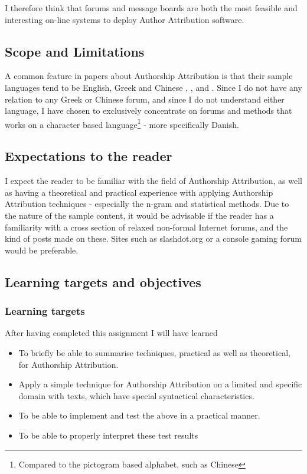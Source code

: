 I therefore think that forums and message boards are both the most feasible and  interesting on-line systems to deploy Author Attribution software.

\subsection{Scope and Limitations}
\label{scope}
A common feature in papers about Authorship Attribution is that their sample languages tend to be English, Greek and Chinese \cite{syntactic}, \cite{nr2}, \cite{nr4} and \cite{app-spe}. Since I do not have any relation to any Greek or Chinese forum, and since I do not understand either language, I have chosen to exclusively concentrate on forums and methods that works on a character based language\footnote{Compared to the pictogram based alphabet, such as Chinese} - more specifically Danish.

\subsection{Expectations to the reader}
\label{expectations}
I expect the reader to be familiar with the field of Authorship Attribution, as well as having a theoretical and practical experience with applying Authorship Attribution techniques - especially the n-gram and statistical methods. Due to the nature of the sample content, it would be advisable if the reader has a familiarity with a cross section of relaxed non-formal Internet forums, and the kind of posts made on these. Sites such as slashdot.org or a console gaming forum would be preferable.

\subsection{Learning targets and objectives}
\label{learning}
\subsubsection{Learning targets}
After having completed this assignment I will have learned 
\begin{itemize}
\item To briefly be able to summarise techniques, practical as well as theoretical, for Authorship Attribution.
\item Apply a simple technique for Authorship Attribution on a limited and specific domain with texts, which have special syntactical characteristics.
\item To be able to implement and test the above in a practical manner.
\item To be able to properly interpret these test results
\end{itemize}

